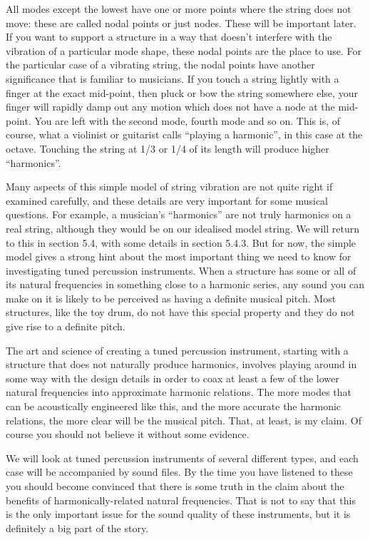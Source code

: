   All modes except the lowest have one or more points where the string does not 
  move: these are called nodal points or just nodes. These will be important 
  later. If you want to support a structure in a way that doesn't interfere 
  with the vibration of a particular mode shape, these nodal points are the 
  place to use. For the particular case of a vibrating string, the nodal points 
  have another significance that is familiar to musicians. If you touch a 
  string lightly with a finger at the exact mid-point, then pluck or bow the 
  string somewhere else, your finger will rapidly damp out any motion which 
  does not have a node at the mid-point. You are left with the second mode, 
  fourth mode and so on. This is, of course, what a violinist or guitarist 
  calls ``playing a harmonic'', in this case at the octave. Touching the string 
  at 1/3 or 1/4 of its length will produce higher ``harmonics''. 

  Many aspects of this simple model of string vibration are not quite right if 
  examined carefully, and these details are very important for some musical 
  questions. For example, a musician's ``harmonics'' are not truly harmonics on 
  a real string, although they would be on our idealised model string. We will 
  return to this in section 5.4, with some details in section 5.4.3. But for 
  now, the simple model gives a strong hint about the most important thing we 
  need to know for investigating tuned percussion instruments. When a structure 
  has some or all of its natural frequencies in something close to a harmonic 
  series, any sound you can make on it is likely to be perceived as having a 
  definite musical pitch. Most structures, like the toy drum, do not have this 
  special property and they do not give rise to a definite pitch. 

  The art and science of creating a tuned percussion instrument, starting with 
  a structure that does not naturally produce harmonics, involves playing 
  around in some way with the design details in order to coax at least a few of 
  the lower natural frequencies into approximate harmonic relations. The more 
  modes that can be acoustically engineered like this, and the more accurate 
  the harmonic relations, the more clear will be the musical pitch. That, at 
  least, is my claim. Of course you should not believe it without some 
  evidence. 

  We will look at tuned percussion instruments of several different types, and 
  each case will be accompanied by sound files. By the time you have listened 
  to these you should become convinced that there is some truth in the claim 
  about the benefits of harmonically-related natural frequencies. That is not 
  to say that this is the only important issue for the sound quality of these 
  instruments, but it is definitely a big part of the story. 

